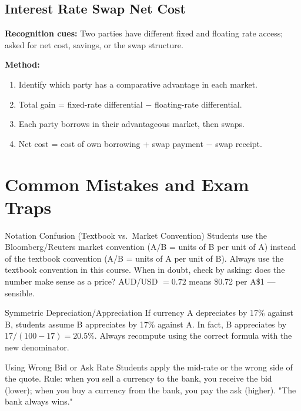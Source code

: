 \documentclass[11pt,a4paper]{article}
\begin{document}
\subsection{Interest Rate Swap Net Cost}

\textbf{Recognition cues:} Two parties have different fixed and floating rate access; asked for net cost, savings, or the swap structure.

\textbf{Method:}
\begin{enumerate}
  \item Identify which party has a comparative advantage in each market.
  \item Total gain = fixed-rate differential $-$ floating-rate differential.
  \item Each party borrows in their advantageous market, then swaps.
  \item Net cost = cost of own borrowing + swap payment $-$ swap receipt.
\end{enumerate}

\newpage

\section{Common Mistakes and Exam Traps}

\begin{mistakebox}{Notation Confusion (Textbook vs.\ Market Convention)}
Students use the Bloomberg/Reuters market convention (A/B = units of B per unit of A) instead of the textbook convention (A/B = units of A per unit of B). Always use the textbook convention in this course. When in doubt, check by asking: does the number make sense as a price? AUD/USD $= 0.72$ means \$0.72 per A\$1 --- sensible.
\end{mistakebox}

\begin{mistakebox}{Symmetric Depreciation/Appreciation}
If currency A depreciates by 17\% against B, students assume B appreciates by 17\% against A. In fact, B appreciates by $17/(100-17) = 20.5\%$. Always recompute using the correct formula with the new denominator.
\end{mistakebox}

\begin{mistakebox}{Using Wrong Bid or Ask Rate}
Students apply the mid-rate or the wrong side of the quote. Rule: when you sell a currency to the bank, you receive the bid (lower); when you buy a currency from the bank, you pay the ask (higher). "The bank always wins."
\end{mistakebox}
\end{document}

